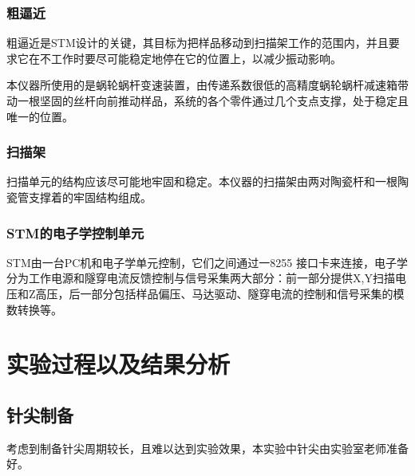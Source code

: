 \documentclass[aps,pre,12pt,preprint,onecolumn,showpacs,showkeys]{revtex4-1}
\begin{document}
\subsubsection{粗逼近}
粗逼近是STM设计的关键，其目标为把样品移动到扫描架工作的范围内，并且要求它在不工作时要尽可能稳定地停在它的位置上，以减少振动影响。\par
本仪器所使用的是蜗轮蜗杆变速装置，由传递系数很低的高精度蜗轮蜗杆减速箱带动一根坚固的丝杆向前推动样品，系统的各个零件通过几个支点支撑，处于稳定且唯一的位置。
\subsubsection{扫描架}
扫描单元的结构应该尽可能地牢固和稳定。本仪器的扫描架由两对陶瓷杆和一根陶瓷管支撑着的牢固结构组成。
\subsubsection{STM的电子学控制单元}
STM由一台PC机和电子学单元控制，它们之间通过一8255 接口卡来连接，电子学分为工作电源和隧穿电流反馈控制与信号采集两大部分：前一部分提供X,Y扫描电压和Z高压，后一部分包括样品偏压、马达驱动、隧穿电流的控制和信号采集的模数转换等。





\section{实验过程以及结果分析}
\subsection{针尖制备}
考虑到制备针尖周期较长，且难以达到实验效果，本实验中针尖由实验室老师准备好。
\end{document}
